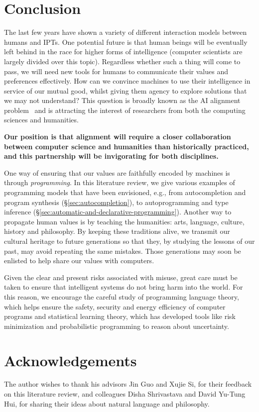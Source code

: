 \documentclass[12pt]{article}
\begin{document}
\section{Conclusion}

The last few years have shown a variety of different interaction models between humans and IPTs. One potential future is that human beings will be eventually left behind in the race for higher forms of intelligence (computer scientists are largely divided over this topic). Regardless whether such a thing will come to pass, we will need new tools for humans to communicate their values and preferences effectively. How can we convince machines to use their intelligence in service of our mutual good, whilst giving them agency to explore solutions that we may not understand? This question is broadly known as the AI alignment problem~\cite{kim2018mimetic, christian2020alignment} and is attracting the interest of researchers from both the computing sciences and humanities.

\textbf{Our position is that alignment will require a closer collaboration between computer science and humanities than historically practiced, and this partnership will be invigorating for both disciplines.}

One way of ensuring that our values are faithfully encoded by machines is through \textit{programming}. In this literature review, we give various examples of programming models that have been envisioned, e.g., from autocompletion and program synthesis (\S\ref{sec:autocompletion}), to autoprogramming and type inference (\S\ref{sec:automatic-and-declarative-programming}). Another way to propagate human values is by teaching the humanities: arts, language, culture, history and philosophy. By keeping these traditions alive, we transmit our cultural heritage to future generations so that they, by studying the lessons of our past, may avoid repeating the same mistakes. Those generations may soon be enlisted to help share our values with computers.

Given the clear and present risks associated with misuse, great care must be taken to ensure that intelligent systems do not bring harm into the world. For this reason, we encourage the careful study of programming language theory, which helps ensure the safety, security and energy efficiency of computer programs and statistical learning theory, which has developed tools like risk minimization and probabilistic programming to reason about uncertainty.

\section{Acknowledgements}

The author wishes to thank his advisors Jin Guo and Xujie Si, for their feedback on this literature review, and colleagues Disha Shrivastava and David Yu-Tung Hui, for sharing their ideas about natural language and philosophy.

  
  
\end{document}
